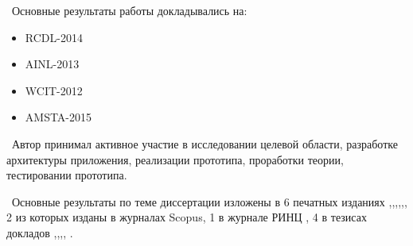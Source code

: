 \probation\
Основные результаты работы докладывались на:
\begin{itemize}
	\item RCDL-2014
	\item AINL-2013
	\item WCIT-2012
	\item AMSTA-2015
\end{itemize}

\contribution\ Автор принимал активное участие в исследовании целевой области, разработке архитектуры приложения, реализации прототипа, проработки теории, тестировании прототипа.

\publications\ Основные результаты по теме диссертации изложены в 6 печатных изданиях  \cite{Lobachevskii},\cite{WCIT-2012},\cite{RCDL-2014},\cite{AINL-2013},\cite{ISGZ},\cite{AMSTA-2015}, 
2 из которых изданы в журналах Scopus, 1 в журнале РИНЦ  \cite{ISGZ}, 
4 в тезисах докладов \cite{Lobachevskii},\cite{WCIT-2012},\cite{AINL-2013},\cite{ISGZ}, \cite{IJSE-1}.



